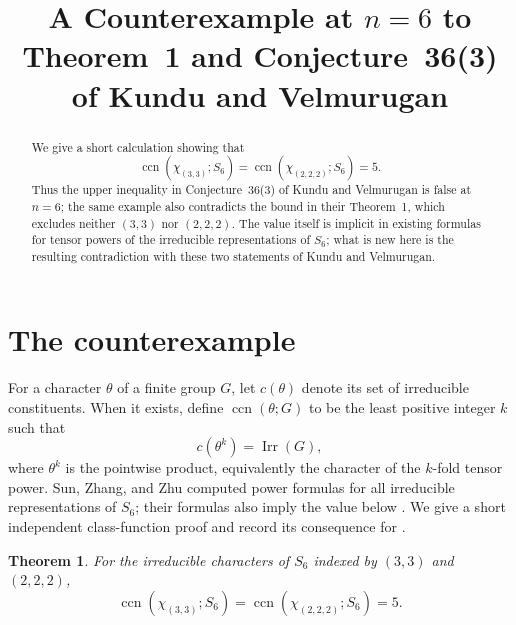 \documentclass[11pt]{amsart}
\title[A counterexample at $n=6$]
{A Counterexample at $n=6$ to Theorem~1 and Conjecture~36(3)
of Kundu and Velmurugan}
\date{}
\newtheorem{theorem}{Theorem}
\theoremstyle{remark}
\newcommand{\Irr}{\operatorname{Irr}}
\newcommand{\ccn}{\operatorname{ccn}}
\begin{document}
\begin{abstract}
We give a short calculation showing that
\[
  \ccn(\chi_{(3,3)};S_6)
  =
  \ccn(\chi_{(2,2,2)};S_6)
  =5.
\]
Thus the upper inequality in Conjecture~36(3) of Kundu and
Velmurugan is false at \(n=6\); the same example also contradicts the
bound in their Theorem~1, which excludes neither \((3,3)\) nor
\((2,2,2)\). The value itself is implicit in existing formulas
for tensor powers of the irreducible representations of \(S_6\); what
is new here is the resulting contradiction with these two statements of
Kundu and Velmurugan.
\end{abstract}

\maketitle

\section{The counterexample}

For a character \(\theta\) of a finite group \(G\), let \(c(\theta)\)
denote its set of irreducible constituents. When it exists, define
\(\ccn(\theta;G)\) to be the least positive integer \(k\) such that
\[
  c(\theta^k)=\Irr(G),
\]
where \(\theta^k\) is the pointwise product, equivalently the character
of the \(k\)-fold tensor power. Sun, Zhang, and Zhu computed power
formulas for all irreducible representations of \(S_6\); their formulas
also imply the value below \cite{SZZ}. We give a short independent
class-function proof and record its consequence for \cite{KV}.

\begin{theorem}\label{thm:main}
For the irreducible characters of \(S_6\) indexed by \((3,3)\) and
\((2,2,2)\),
\[
  \ccn(\chi_{(3,3)};S_6)
  =
  \ccn(\chi_{(2,2,2)};S_6)
  =5.
\]
\end{theorem}
\end{document}
